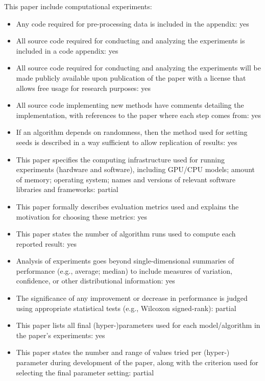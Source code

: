 \documentclass[letterpaper]{article} %
\begin{document}
This paper include computational experiments:
\begin{itemize}
	\item Any code required for pre-processing data is included in the appendix: yes
	\item All source code required for conducting and analyzing the experiments is included in a code appendix: yes
	\item All source code required for conducting and analyzing the experiments will be made publicly available upon publication of the paper with a license that allows free usage for research purposes: yes
	\item All source code implementing new methods have comments detailing the implementation, with references to the paper where each step comes from: yes
	\item If an algorithm depends on randomness, then the method used for setting seeds is described in a way sufficient to allow replication of results: yes
	\item This paper specifies the computing infrastructure used for running experiments (hardware and software), including GPU/CPU models; amount of memory; operating system; names and versions of relevant software libraries and frameworks: partial
	\item This paper formally describes evaluation metrics used and explains the motivation for choosing these metrics: yes
	\item This paper states the number of algorithm runs used to compute each reported result: yes
	\item Analysis of experiments goes beyond single-dimensional summaries of performance (e.g., average; median) to include measures of variation, confidence, or other distributional information: yes
	\item The significance of any improvement or decrease in performance is judged using appropriate statistical tests (e.g., Wilcoxon signed-rank): partial
	\item This paper lists all final (hyper-)parameters used for each model/algorithm in the paper’s experiments: yes
	\item This paper states the number and range of values tried per (hyper-) parameter during development of the paper, along with the criterion used for selecting the final parameter setting: partial
\end{itemize}
\end{document}
